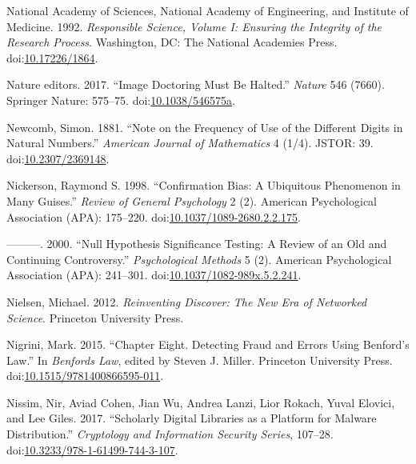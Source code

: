 \documentclass[a5paper]{book}
\begin{document}
\hypertarget{ref-doi:10.17226ux2f1864}{}
National Academy of Sciences, National Academy of Engineering, and
Institute of Medicine. 1992. \emph{Responsible Science, Volume I:
Ensuring the Integrity of the Research Process}. Washington, DC: The
National Academies Press.
doi:\href{https://doi.org/10.17226/1864}{10.17226/1864}.

\hypertarget{ref-doi:10.1038ux2f546575a}{}
Nature editors. 2017. ``Image Doctoring Must Be Halted.'' \emph{Nature}
546 (7660). Springer Nature: 575--75.
doi:\href{https://doi.org/10.1038/546575a}{10.1038/546575a}.

\hypertarget{ref-doi:10.2307ux2f2369148}{}
Newcomb, Simon. 1881. ``Note on the Frequency of Use of the Different
Digits in Natural Numbers.'' \emph{American Journal of Mathematics} 4
(1/4). JSTOR: 39.
doi:\href{https://doi.org/10.2307/2369148}{10.2307/2369148}.

\hypertarget{ref-doi:10.1037ux2f1089-2680.2.2.175}{}
Nickerson, Raymond S. 1998. ``Confirmation Bias: A Ubiquitous Phenomenon
in Many Guises.'' \emph{Review of General Psychology} 2 (2). American
Psychological Association (APA): 175--220.
doi:\href{https://doi.org/10.1037/1089-2680.2.2.175}{10.1037/1089-2680.2.2.175}.

\hypertarget{ref-doi:10.1037ux2f1082-989X.5.2.241}{}
---------. 2000. ``Null Hypothesis Significance Testing: A Review of an
Old and Continuing Controversy.'' \emph{Psychological Methods} 5 (2).
American Psychological Association (APA): 241--301.
doi:\href{https://doi.org/10.1037/1082-989x.5.2.241}{10.1037/1082-989x.5.2.241}.

\hypertarget{ref-isbn:9780691148908}{}
Nielsen, Michael. 2012. \emph{Reinventing Discover: The New Era of
Networked Science}. Princeton University Press.

\hypertarget{ref-doi:10.1515ux2f9781400866595-011}{}
Nigrini, Mark. 2015. ``Chapter Eight. Detecting Fraud and Errors Using
Benford's Law.'' In \emph{Benfords Law}, edited by Steven J. Miller.
Princeton University Press.
doi:\href{https://doi.org/10.1515/9781400866595-011}{10.1515/9781400866595-011}.

\hypertarget{ref-doi:10.3233ux2f978-1-61499-744-3-107}{}
Nissim, Nir, Aviad Cohen, Jian Wu, Andrea Lanzi, Lior Rokach, Yuval
Elovici, and Lee Giles. 2017. ``Scholarly Digital Libraries as a
Platform for Malware Distribution.'' \emph{Cryptology and Information
Security Series}, 107--28.
doi:\href{https://doi.org/10.3233/978-1-61499-744-3-107}{10.3233/978-1-61499-744-3-107}.
\end{document}

